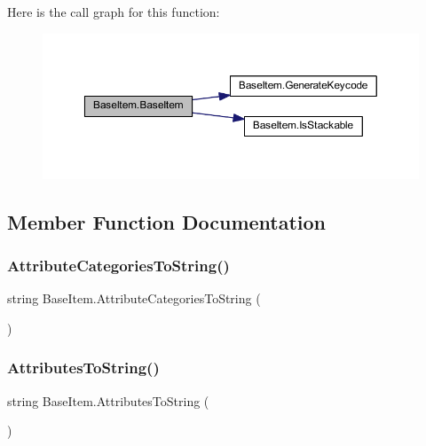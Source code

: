 Here is the call graph for this function\+:
\nopagebreak
\begin{figure}[H]
\begin{center}
\leavevmode
\includegraphics[width=350pt]{class_base_item_a4faa2410aa193b87718cc3ed337c0766_cgraph}
\end{center}
\end{figure}


\subsection{Member Function Documentation}
\mbox{\label{class_base_item_ac92f27fa7357e9cb20c62704ecca021a}} 
\subsubsection{\texorpdfstring{AttributeCategoriesToString()}{AttributeCategoriesToString()}}
{\footnotesize\ttfamily string Base\+Item.\+Attribute\+Categories\+To\+String (\begin{DoxyParamCaption}{ }\end{DoxyParamCaption})}

\mbox{\label{class_base_item_afd59d6b5168af724211f54ad3692ea73}} 
\subsubsection{\texorpdfstring{AttributesToString()}{AttributesToString()}}
{\footnotesize\ttfamily string Base\+Item.\+Attributes\+To\+String (\begin{DoxyParamCaption}{ }\end{DoxyParamCaption})}

